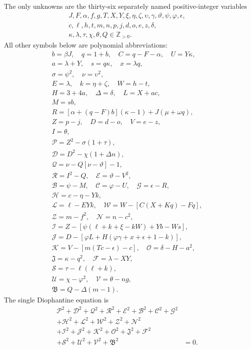 The only unknowns are the thirty-six separately named positive-integer variables
\[
\begin{gathered}J,F,\alpha,f,g,T,X,Y,\xi,\eta,\zeta,\upsilon,\gamma,\vartheta,\psi,\varphi,\epsilon,\\
c,\ell,h,t,m,n,p,j,d,o,e,z,\delta,\\
\kappa,\lambda,\tau,\chi,\theta,Q\in\mathbb Z_{>0}.\end{gathered}
\]
All other symbols below are polynomial abbreviations:
\[
\begin{gathered}
b=\beta J,\quad q=1+b,\quad C=q-F-\alpha,\quad U=Y\kappa,\\
a=\lambda+Y,\quad s=q\kappa,\quad x=\lambda q,\\
\sigma=\psi^2,\quad\nu=\upsilon^2,\\
E=\lambda,\quad k=\eta+\zeta,\quad W=h-t,\\
H=3+4a,\quad\Delta=\delta,\quad L=X+ac,\\
M=sb,\\
R=[\alpha+(q-F)b](\kappa-1)+J(\mu+\omega q),\\
Z=p-j,\quad D=d-o,\quad V=e-z,\\
I=\theta,\\
\mathcal{P}=Z^2-\sigma(1+\tau),\\
\mathcal{D}=D^2-\chi(1+\Delta n),\\
\mathcal{Q}=\nu-Q[\nu-\vartheta]-1,\\
\mathcal{R}=I^2-Q,\quad \mathcal{E}=\vartheta-V^2,\\
\mathcal{B}=\psi-M,\quad \mathcal{C}=\varphi-U,\quad \mathcal{G}=\epsilon-R,\\
\mathcal{H}=c-\eta-Yk,\\
\mathcal{L}=\ell-EYk,\quad \mathcal{W}=W-[C(X+Kq)-Fq],\\
\mathcal{Z}=m-f^2,\quad \mathcal{N}=n-c^2,\\
\mathcal{I}=Z-[\psi(\ell+k+\xi-kW)+Yb-Ws],\\
\mathcal{J}=D-[\varphi L+H(\varphi\gamma+x+\epsilon+1-k)],\\
\mathcal{K}=V-[m(Tc-\epsilon)-c],\quad\mathcal{O}=\delta-H-a^2,\\
\mathfrak{J}=\kappa-q^2,\quad\mathcal{F}=\lambda-XY,\\
\mathcal{S}=\tau-\ell(\ell+k),\\
\mathcal{U}=\chi-\varphi^2,\quad\mathcal{V}=\theta-ng,\\
\mathfrak{B}=Q-\Delta(m-1).
\end{gathered}
\]
The single Diophantine equation is
\[
\begin{split}
\mathcal{P}^2+\mathcal{D}^2+\mathcal{Q}^2+\mathcal{R}^2+\mathcal{E}^2+\mathcal{B}^2+\mathcal{C}^2+\mathcal{G}^2 &\\
+\mathcal{H}^2+\mathcal{L}^2+\mathcal{W}^2+\mathcal{Z}^2+\mathcal{N}^2 &\\
+\mathcal{I}^2+\mathcal{J}^2+\mathcal{K}^2+\mathcal{O}^2+\mathfrak{J}^2+\mathcal{F}^2 &\\
+\mathcal{S}^2+\mathcal{U}^2+\mathcal{V}^2+\mathfrak{B}^2 &= 0.
\end{split}
\]
